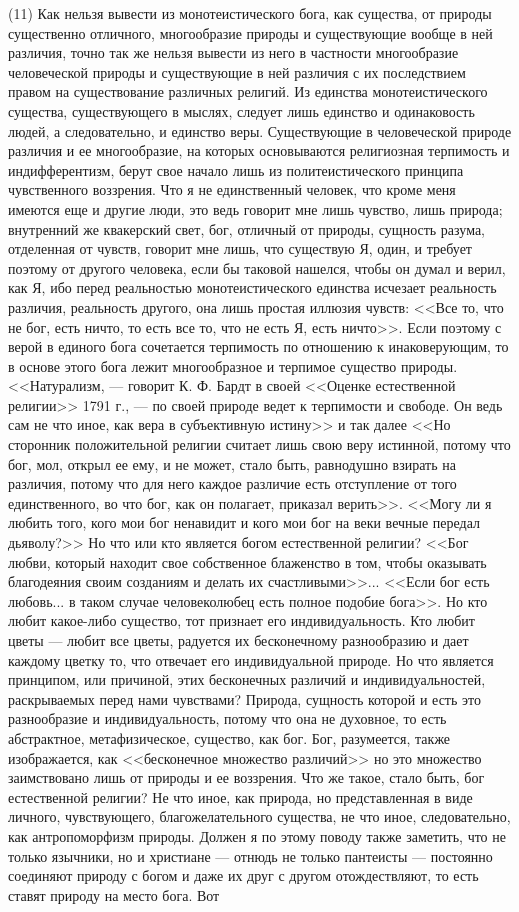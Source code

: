\documentclass[12pt]{article}
\begin{document}
(11) Как нельзя вывести из монотеистического бога, как существа, от природы существенно отличного, многообразие природы и существующие вообще в ней различия, точно так же нельзя вывести из него в частности многообразие человеческой природы и существующие в ней различия с их последствием правом на существование различных религий. Из единства монотеистического существа, существующего в мыслях, следует лишь единство и одинаковость людей, а следовательно, и единство веры. Существующие в человеческой природе различия и ее многообразие, на которых основываются религиозная терпимость и индифферентизм, берут свое начало лишь из политеистического принципа чувственного воззрения. Что я не единственный человек, что кроме меня имеются еще и другие люди, это ведь говорит мне лишь чувство, лишь природа; внутренний же квакерский свет, бог, отличный от природы, сущность разума, отделенная от чувств, говорит мне лишь, что существую Я, один, и требует поэтому от другого человека, если бы таковой нашелся, чтобы он думал и верил, как Я, ибо перед реальностью монотеистического единства исчезает реальность различия, реальность другого, она лишь простая иллюзия чувств: <<Все то, что не бог, есть ничто, то есть все то, что не есть Я, есть ничто>>. Если поэтому с верой в единого бога сочетается терпимость по отношению к инаковерующим, то в основе этого бога лежит многообразное и терпимое существо природы. <<Натурализм, --- говорит К. Ф. Бардт в своей <<Оценке естественной религии>> 1791 г., --- по своей природе ведет к терпимости и свободе. Он ведь сам не что иное, как вера в субъективную истину>> и так далее <<Но сторонник положительной религии считает лишь свою веру истинной, потому что бог, мол, открыл ее ему, и не может, стало быть, равнодушно взирать на различия, потому что для него каждое различие есть отступление от того единственного, во что бог, как он полагает, приказал верить>>. <<Могу ли я любить того, кого мои бог ненавидит и кого мои бог на веки вечные передал дьяволу?>> Но что или кто является богом естественной религии? <<Бог любви, который находит свое собственное блаженство в том, чтобы оказывать благодеяния своим созданиям и делать их счастливыми>>... <<Если бог есть любовь... в таком случае человеколюбец есть полное подобие бога>>. Но кто любит какое-либо существо, тот признает его индивидуальность. Кто любит цветы --- любит все цветы, радуется их бесконечному разнообразию и дает каждому цветку то, что отвечает его индивидуальной природе. Но что является принципом, или причиной, этих бесконечных различий и индивидуальностей, раскрываемых перед нами чувствами? Природа, сущность которой и есть это разнообразие и индивидуальность, потому что она не духовное, то есть абстрактное, метафизическое, существо, как бог. Бог, разумеется, также изображается, как <<бесконечное множество различий>>  но это множество заимствовано лишь от природы и ее воззрения. Что же такое, стало быть, бог естественной религии? Не что иное, как природа, но представленная в виде личного, чувствующего, благожелательного существа, не что иное, следовательно, как антропоморфизм природы. Должен я по этому поводу также заметить, что не только язычники, но и христиане --- отнюдь не только пантеисты --- постоянно соединяют природу с богом и даже их друг с другом отождествляют, то есть ставят природу на место бога. Вот 
\end{document}
